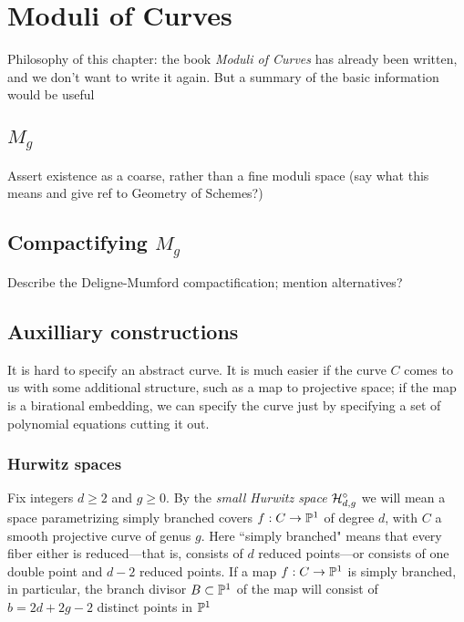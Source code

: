

\chapter{Moduli of Curves}
\label{Moduli chapter}

Philosophy of this chapter: the book \emph{Moduli of Curves} has already been written, and we don't want to write it again. But a summary of the basic information would be useful

\section{$M_g$}

Assert existence as a coarse, rather than a fine moduli space (say what this means and give ref to Geometry of Schemes?)

\section{Compactifying $M_g$}

Describe the Deligne-Mumford compactification; mention alternatives?

\section{Auxilliary constructions}

It is hard to specify an abstract curve. It is much easier if the curve $C$ comes to us with some additional structure, such as a map to projective space; if the map is a birational embedding, we can specify the curve just by specifying a set of polynomial equations cutting it out. 

\subsection{Hurwitz spaces}

Fix integers $d \geq 2$ and $g \geq 0$. By the \emph{small Hurwitz space} $\cH^\circ_{d,g}$ we will mean a space parametrizing simply branched covers $f : C \to \PP^1$ of degree $d$, with $C$ a smooth projective curve of genus $g$. Here ``simply branched" means that every fiber  either is reduced---that is, consists of $d$ reduced points---or consists of one double point and $d-2$ reduced points. If a map $f : C \to \PP^1$ is simply branched, in particular, the branch divisor $B \subset \PP^1$ of the map will consist of $b = 2d+2g-2$ distinct points in $\PP^1$

